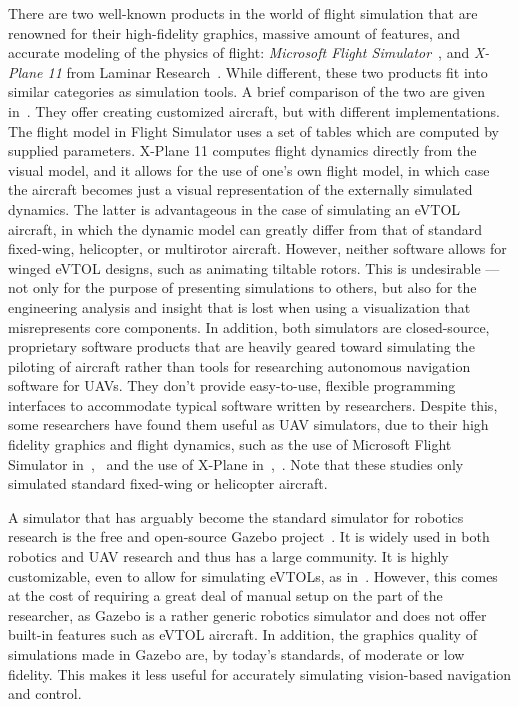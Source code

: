 There are two well-known products in the world of flight simulation that are renowned for their high-fidelity graphics, massive amount of features, and accurate modeling of the physics of flight: \textit{Microsoft Flight Simulator}~\cite{Microsoft2020}, and \textit{X-Plane 11} from Laminar Research~\cite{X-plane112020}. While different, these two products fit into similar categories as simulation tools. A brief comparison of the two are given in~\cite{Gimenes2008}. They offer creating customized aircraft, but with different implementations. The flight model in Flight Simulator uses a set of tables which are computed by supplied parameters. X-Plane 11 computes flight dynamics directly from the visual model, and it allows for the use of one's own flight model, in which case the aircraft becomes just a visual representation of the externally simulated dynamics. The latter is advantageous in the case of simulating an eVTOL aircraft, in which the dynamic model can greatly differ from that of standard fixed-wing, helicopter, or multirotor aircraft. However, neither software allows for winged eVTOL designs, such as animating tiltable rotors. This is undesirable --- not only for the purpose of presenting simulations to others, but also for the engineering analysis and insight that is lost when using a visualization that misrepresents core components. In addition, both simulators are closed-source, proprietary software products that are heavily geared toward simulating the piloting of aircraft rather than tools for researching autonomous navigation software for UAVs. They don't provide easy-to-use, flexible programming interfaces to accommodate typical software written by researchers. Despite this, some researchers have found them useful as UAV simulators, due to their high fidelity graphics and flight dynamics, such as the use of Microsoft Flight Simulator in~\cite{Marcu2011},~\cite{Louali2011} and the use of X-Plane in~\cite{Garcia2010},~\cite{Cho2021}. Note that these studies only simulated standard fixed-wing or helicopter aircraft.

A simulator that has arguably become the standard simulator for robotics research is the free and open-source Gazebo project~\cite{Koenig2004}. It is widely used in both robotics and UAV research and thus has a large community. It is highly customizable, even to allow for simulating eVTOLs, as in~\cite{Carlson2021}. However, this comes at the cost of requiring a great deal of manual setup on the part of the researcher, as Gazebo is a rather generic robotics simulator and does not offer built-in features such as eVTOL aircraft. In addition, the graphics quality of simulations made in Gazebo are, by today's standards, of moderate or low fidelity. This makes it less useful for accurately simulating vision-based navigation and control.

